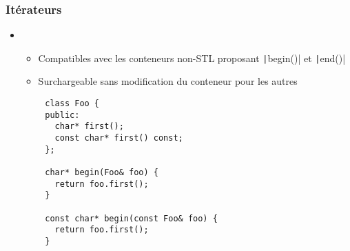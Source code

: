 \documentclass[C++.tex]{subfiles}
\begin{document}
\begin{frame}[fragile]
\end{frame}

\begin{frame}[fragile]
	\frametitle{Itérateurs}
	\begin{itemize}
		\item [] \begin{itemize}
			\item Compatibles avec les conteneurs non-STL proposant \texttt|begin()| et \texttt|end()|
			\item Surchargeable sans modification du conteneur pour les autres
		\end{itemize}
	\end{itemize}

	\begin{verbatim}
		class Foo {
		public:
		  char* first();
		  const char* first() const;
		};

		char* begin(Foo& foo) {
		  return foo.first();
		}

		const char* begin(const Foo& foo) {
		  return foo.first();
		}
	\end{verbatim}
\end{frame}
\end{document}
